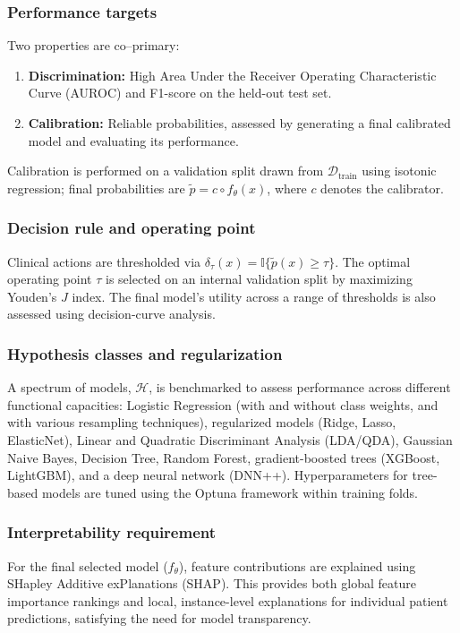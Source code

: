 \subsubsection{Performance targets}
Two properties are co–primary:
\begin{enumerate}[label=(\alph*)]
  \item \textbf{Discrimination:} High Area Under the Receiver Operating Characteristic Curve (AUROC) and F1-score on the held-out test set.
  \item \textbf{Calibration:} Reliable probabilities, assessed by generating a final calibrated model and evaluating its performance.
\end{enumerate}
Calibration is performed on a validation split drawn from $\mathcal{D}_{\mathrm{train}}$ using isotonic regression; final probabilities are $\tilde p=c\circ f_{\theta}(x)$, where $c$ denotes the calibrator.

\subsubsection{Decision rule and operating point}
Clinical actions are thresholded via $\delta_{\tau}(x)=\mathbb{I}\{\tilde p(x)\ge \tau\}$. The optimal operating point $\tau$ is selected on an internal validation split by maximizing Youden's $J$ index. The final model's utility across a range of thresholds is also assessed using decision-curve analysis.

\subsubsection{Hypothesis classes and regularization}
A spectrum of models, $\mathcal{H}$, is benchmarked to assess performance across different functional capacities: Logistic Regression (with and without class weights, and with various resampling techniques), regularized models (Ridge, Lasso, ElasticNet), Linear and Quadratic Discriminant Analysis (LDA/QDA), Gaussian Naive Bayes, Decision Tree, Random Forest, gradient-boosted trees (XGBoost, LightGBM), and a deep neural network (DNN++). Hyperparameters for tree-based models are tuned using the Optuna framework within training folds.

\subsubsection{Interpretability requirement}
For the final selected model ($f_{\theta}$), feature contributions are explained using SHapley Additive exPlanations (SHAP). This provides both global feature importance rankings and local, instance-level explanations for individual patient predictions, satisfying the need for model transparency.

